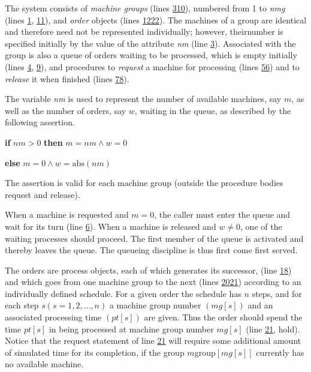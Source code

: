 The system consists of \textit{machine groups} (lines \hyperref[pg:program-job-shop-3]{3}\textendash \hyperref[pg:program-job-shop-10]{10}), numbered from 1 to \textit{nmg} (lines \hyperref[pg:program-job-shop-1]{1}, \hyperref[pg:program-job-shop-11]{11}), and \textit{order} objects (lines \hyperref[pg:program-job-shop-12]{12}\textendash \hyperref[pg:program-job-shop-22]{22}). The machines of a group are identical and therefore need not be represented individually; however, theirnumber is specified initially by the value of the attribute \textit{nm} (line \hyperref[pg:program-job-shop-3]{3}). Associated with the group is also a queue of orders waiting to be processed, which is empty initially (lines \hyperref[pg:program-job-shop-4]{4}, \hyperref[pg:program-job-shop-9]{9}), and procedures to \textit{request} a machine for processing (lines \hyperref[pg:program-job-shop-5]{5}\textendash \hyperref[pg:program-job-shop-6]{6}) and to \textit{release} it when finished (lines \hyperref[pg:program-job-shop-7]{7}\textendash \hyperref[pg:program-job-shop-8]{8}).

The variable \textit{nm} is used to represent the number of available machines, say $m$, as well as the number of orders, say $w$, waiting in the queue, as described by the following assertion.

\quad \textbf{if} $nm > 0$ \textbf{then} $m = nm \land w = 0$

\quad \textbf{else} $m = 0 \land w = \text{abs}(nm)$

\noindent
The assertion is valid for each machine group (outside the procedure bodies request and release).

When a machine is requested and $m = 0$, the caller must enter the queue and wait for its turn (line \hyperref[pg:program-job-shop-6]{6}). When a machine is released and $w \neq 0$, one of the waiting processes should proceed. The first member of the queue is activated and thereby leaves the queue. The queueing discipline is thus first come first served.

The orders are process objects, each of which generates its successor, (line \hyperref[pg:program-job-shop-18]{18}) and which goes from one machine group to the next (lines \hyperref[pg:program-job-shop-20]{20}\textendash \hyperref[pg:program-job-shop-21]{21}) according to an individually defined schedule. For a given order the schedule has $n$ steps, and for each step $s(s = 1, 2, \dots, n)$ a machine group number $(mg[s])$ and an associated processing time $(pt[s])$ are given. Thus the order should spend the time $pt[s]$ in being processed at machine group number $mg[s]$ (line \hyperref[pg:program-job-shop-21]{21}, hold). Notice that the request statement of line \hyperref[pg:program-job-shop-21]{21} will require some additional amount of simulated time for its completion, if the group $m$group$[mg[s]]$ currently has no available machine.

